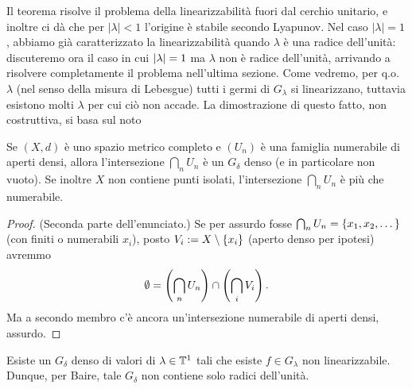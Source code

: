 Il teorema risolve il problema della linearizzabilità fuori dal cerchio unitario, e inoltre ci dà che per $|\lambda|<1$ l'origine è stabile secondo Lyapunov. Nel caso $|\lambda|=1$,
abbiamo già caratterizzato la linearizzabilità quando $\lambda$ è una radice dell'unità: discuteremo ora il caso in cui $\left|\lambda\right|=1$ ma $\lambda$ non è radice dell'unità, arrivando a risolvere completamente il problema nell'ultima sezione. Come vedremo, per q.o. $\lambda$ (nel senso della misura di Lebesgue) tutti i germi di $G_\lambda$ si linearizzano, tuttavia esistono molti $\lambda$ per cui ciò non accade. La dimostrazione di questo fatto, non costruttiva, si basa sul noto

\begin{teo}Se $(X,d)$ è uno spazio metrico completo e $(U_n)$ è una famiglia numerabile di aperti densi,
allora l'intersezione $\bigcap_n U_n$ è un $G_\delta$ denso (e in particolare non vuoto). Se inoltre $X$ non contiene punti isolati, l'intersezione $\bigcap_n U_n$ è più che numerabile.
\end{teo}

\begin{proof} (Seconda parte dell'enunciato.) Se per assurdo fosse $\bigcap_n U_n=\left\{x_1,x_2,\dots\right\}$ (con finiti o numerabili $x_i$),
posto $V_i:=X\setminus\left\{x_i\right\}$ (aperto denso per ipotesi) avremmo
\[ \emptyset=\left(\bigcap_n U_n\right)\cap\left(\bigcap_i V_i\right). \]
Ma a secondo membro c'è ancora un'intersezione numerabile di aperti densi, assurdo.
\end{proof}

\begin{teo} Esiste un $G_\delta$ denso di valori di $\lambda\in\mathbb{T}^1$ tali che esiste $f\in G_\lambda$ non linearizzabile. Dunque, per Baire, tale $G_\delta$ non contiene solo radici dell'unità.\end{teo}


